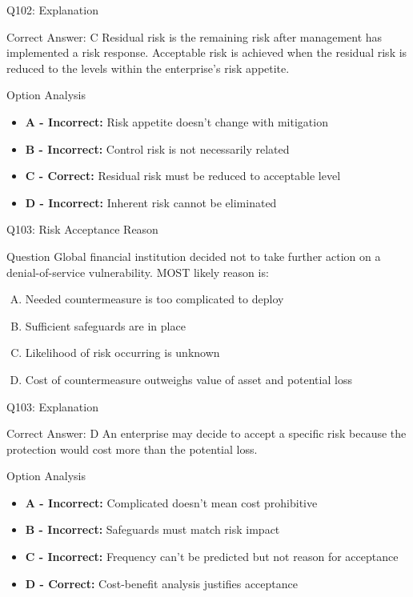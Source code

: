 \documentclass{beamer}
\begin{document}
	\begin{frame}{Q102: Explanation}
		\begin{block}{Correct Answer: C}
			Residual risk is the remaining risk after management has implemented a risk response. Acceptable risk is achieved when the residual risk is reduced to the levels within the enterprise's risk appetite.
		\end{block}
		\begin{block}{Option Analysis}
			\begin{itemize}
				\item \textbf{A - Incorrect:} Risk appetite doesn't change with mitigation
				\item \textbf{B - Incorrect:} Control risk is not necessarily related
				\item \textbf{C - Correct:} Residual risk must be reduced to acceptable level
				\item \textbf{D - Incorrect:} Inherent risk cannot be eliminated
			\end{itemize}
		\end{block}
	\end{frame}
	
	\begin{frame}{Q103: Risk Acceptance Reason}
		\begin{block}{Question}
			Global financial institution decided not to take further action on a denial-of-service vulnerability. MOST likely reason is:
		\end{block}
		\begin{enumerate}[(A)]
			\item Needed countermeasure is too complicated to deploy
			\item Sufficient safeguards are in place
			\item Likelihood of risk occurring is unknown
			\item Cost of countermeasure outweighs value of asset and potential loss
		\end{enumerate}
	\end{frame}
	
	\begin{frame}{Q103: Explanation}
		\begin{block}{Correct Answer: D}
			An enterprise may decide to accept a specific risk because the protection would cost more than the potential loss.
		\end{block}
		\begin{block}{Option Analysis}
			\begin{itemize}
				\item \textbf{A - Incorrect:} Complicated doesn't mean cost prohibitive
				\item \textbf{B - Incorrect:} Safeguards must match risk impact
				\item \textbf{C - Incorrect:} Frequency can't be predicted but not reason for acceptance
				\item \textbf{D - Correct:} Cost-benefit analysis justifies acceptance
			\end{itemize}
		\end{block}
	\end{frame}
	
\end{document}
